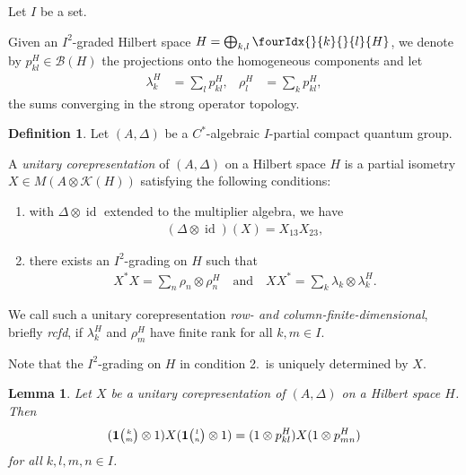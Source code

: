 \documentclass[11pt]{article}
\DeclareMathOperator{\id}{id}
\newcommand{\Grt}[3]{#1{\tiny {\begin{pmatrix} #2\\#3\end{pmatrix}}}}
\newcommand{\UnitC}[2]{\Grt{\mathbf{1}}{#1}{#2}}
\newcommand{\Gr}[5]{\fourIdx{#2}{#4}{#3}{#5}{#1}}%
\newcommand{\Grd}[3]{\Gr{#1}{}{}{#2}{#3}}
\newtheorem{Lem}[Theorem]{Lemma}
\theoremstyle{definition}
\newtheorem{Def}[Theorem]{Definition}
\numberwithin{equation}{section}
\begin{document}
Let $I$ be a set.

Given an $I^{2}$-graded Hilbert space
$H=\bigoplus_{k,l} \Grd{H}{k}{l}$, we denote by
$p_{kl}^{H} \in \mathcal{B}(H)$ the projections onto the homogeneous components and let
\begin{align*}
  \lambda^{H}_{k} &= \sum_{l} p_{kl}^{H}, &
  \rho^{H}_{l} &= \sum_{k} p_{kl}^{H},
\end{align*}
 the sums converging in the strong operator topology.


 \begin{Def} \label{def:corepresentation} Let $(A,\Delta)$ be a
   $C^{*}$-algebraic $I$-partial compact quantum group. 

   A \emph{unitary corepresentation} of $(A,\Delta)$ on a Hilbert
   space $H$ is a partial isometry $X \in M(A \otimes \mathcal{K}(H))$
   satisfying the following conditions:
   \begin{enumerate}
   \item with $\Delta \otimes \id$ extended to the multiplier algebra, we have
     \begin{align} \label{eq:corep}
     (\Delta \otimes \id)(X) = X_{13}X_{23},  
   \end{align}
 \item there exists an $I^{2}$-grading on $H$ such that
     \begin{align} \label{eq:corep-pi}
       X^{*}X= \sum_{n}\rho_{n} \otimes \rho^{H}_{n} \quad \text{and}
       \quad XX^{*} = \sum_{k} \lambda_{k} \otimes \lambda^{H}_{k}.
     \end{align}
   \end{enumerate}
   We call such a unitary corepresentation \emph{row- and column-finite-dimensional}, briefly
   \emph{rcfd}, if $\lambda^{H}_{k}$ and $\rho^{H}_{m}$ have finite rank for all $k,m\in I$.
\end{Def}
Note that the $I^{2}$-grading on $H$ in  condition 2.\ is uniquely
determined by $X$.
\begin{Lem} \label{lem:corep-intertwine}
 Let $X$ be a unitary corepresentation of $(A,\Delta)$ on a Hilbert space $H$. Then 
     \begin{align*}
       (\UnitC{k}{m} \otimes 1)X(\UnitC{l}{n} \otimes 1) = (1 \otimes
       p^{H}_{kl})X(1 \otimes p^{H}_{mn})
     \end{align*}
 for all $k,l,m,n \in I$.
\end{Lem}
\end{document}
